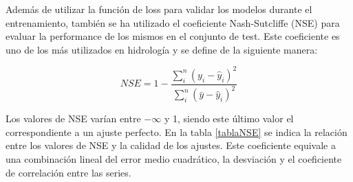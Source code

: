 Además de utilizar la función de loss para validar los modelos durante el entrenamiento, 
también se ha utilizado el coeficiente Nash-Sutcliffe (NSE) \cite{NSE} para evaluar la performance de los mismos en el conjunto de test. 
Este coeficiente es uno de los más utilizados en hidrología y se define de la siguiente manera:

\begin{equation}
  NSE = 1-\frac{\sum^n_i(y_i-\hat{y}_i)^2}{\sum^n_i(\bar{y}-\hat{y}_i)^2}
\end{equation}

Los valores de NSE varían entre $-\infty$ y 1, siendo este último valor el correspondiente a un ajuste perfecto.
En la tabla \ref{tablaNSE} se indica la relación entre los valores de NSE y la calidad de los ajustes.
Este coeficiente equivale a una combinación lineal del error medio
cuadrático, la desviación y el coeficiente de correlación
entre las series.





